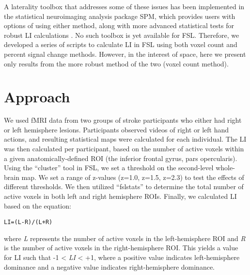 \documentclass[twocolumn]{bmcart}%
\begin{document}
A laterality toolbox that addresses some of these issues has been
implemented in the statistical neuroimaging analysis package SPM, which
provides users with options of using either method, along with more
advanced statistical tests for robust LI calculations \cite{Wilke2007}.
No such toolbox is yet available for FSL. Therefore, we developed a
series of scripts to calculate LI in FSL using both voxel count and
percent signal change methods. However, in the interest of space, here
we present only results from the more robust method of the two (voxel
count method).

\section{Approach}\label{approach}

We used fMRI data from two groups of stroke participants who either had
right or left hemisphere lesions. Participants observed videos of right
or left hand actions, and resulting statistical maps were calculated for
each individual. The LI was then calculated per participant, based on
the number of active voxels within a given anatomically-defined ROI (the
inferior frontal gyrus, pars opercularis). Using the ``cluster'' tool in
FSL, we set a threshold on the second-level whole-brain map. We set a
range of z-values (z=1.0, z=1.5, z=2.3) to test the effects of different
thresholds. We then utilized ``fslstats'' to determine the total number
of active voxels in both left and right hemisphere ROIs. Finally, we
calculated LI based on the equation:

\begin{verbatim}
LI=(L-R)/(L+R)
\end{verbatim}

where \emph{L} represents the number of active voxels in the
left-hemisphere ROI and \emph{R} is the number of active voxels in the
right-hemisphere ROI. This yields a value for LI such that -1
\textless{} \emph{LI} \textless{} +1, where a positive value indicates
left-hemisphere dominance and a negative value indicates
right-hemisphere dominance.
\end{document}
